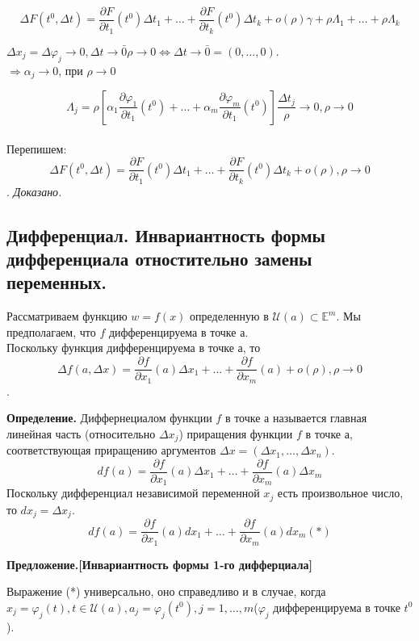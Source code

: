 \documentclass[a4paper,14pt]{article} %
\begin{document}
     \[ \Delta F(t^0, \Delta t) = \frac{\partial F}{\partial t_1}(t^0)\Delta t_1 + \ldots + \frac{\partial F}{\partial t_k}(t^0)\Delta t_k + o(\rho)\gamma + \rho\Lambda_1 + \ldots + \rho \Lambda_k\]

	 $\Delta x_j = \Delta \varphi_j \to 0, \Delta t \to \bar 0
	 \rho \to 0 \Leftrightarrow \Delta t \to \bar0 = (0, \ldots, 0).$\\ $\Rightarrow \alpha_j \to 0$, при $\rho \to 0$
	 
	 \[\Lambda_j = \rho[\alpha_1\frac{\partial \varphi_1}{\partial t_1}(t^0) + \ldots + \alpha_m \frac{\partial \varphi_m}{\partial t_1}(t^0)]\frac{\Delta t_j}{\rho} \to 0, \rho \to 0\]\\
	 Перепишем:
	 \[\Delta F(t^0, \Delta t) = \frac{\partial F}{\partial t_1}(t^0)\Delta t_1 + \ldots + \frac{\partial F}{\partial t_k}(t^0)\Delta t_k + o(\rho), \rho \to 0\].
	 \textit{Доказано.}
	 
	 \subsection*{Дифференциал. Инвариантность формы дифференциала отностительно замены переменных.}
	 
	 Рассматриваем функцию $w = f(x)$ определенную в $\mathscr{U}(a) \subset \mathds{E}^m$. Мы предполагаем, что $f$ дифференцируема в точке а.\\
	 Поскольку функция дифференцируема в точке а, то \[\Delta f(a, \Delta x) = \frac{\partial f}{\partial x_1}(a)\Delta x_1 + \ldots + \frac{\partial f}{\partial x_m}(a) + o(\rho), \rho \to 0\].
	 
	 \textbf{Определение.} Диффернециалом функции $f$ в точке а называется главная линейная часть (относительно $\Delta x_j$) приращения функции $f$ в точке а, соответствующая приращению аргументов $\Delta x = (\Delta x_1, \ldots, \Delta x_n)$.
	 \[df(a) = \frac{\partial f}{\partial x_1}(a)\Delta x_1 + \ldots + \frac{\partial f}{\partial x_m}(a)\Delta x_m\]
	 Поскольку дифференциал независимой переменной $x_j$ есть произвольное число, то $dx_j = \Delta x_j$.
	 \[df(a) = \frac{\partial f}{\partial x_1}(a)dx_1 + \ldots + \frac{\partial f}{\partial x_m}(a)dx_m (*)\]
	 
	 \textbf{Предложение.[Инвариантность формы 1-го дифферциала]} 
	 
	 Выражение (*) универсально, оно справедливо и в случае, когда $x_j = \varphi_j(t), t \in \mathscr{U}(a), a_j = \varphi_j(t^0), j = 1, \ldots, m$($\varphi_j$ дифференцируема в точке $t^0$).
	 
\end{document}
